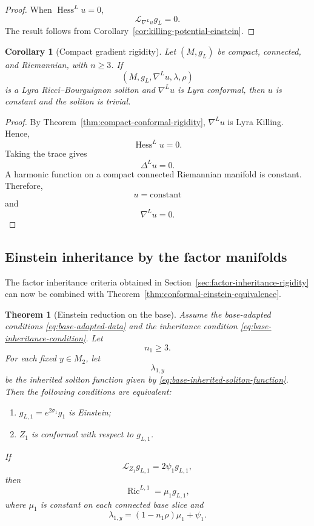 \documentclass[a4paper,11pt]{article}
\theoremstyle{plain}
\newtheorem{theorem}{Theorem}[section]
\newtheorem{corollary} {Corollary}[section]
\numberwithin{equation}{section}
\begin{document}
\begin{proof}
	When \(\operatorname{Hess}^{L}u=0\),
	\[
	\mathcal L_{\nabla^{L}u}g_{L}=0.
	\]
	The result follows from
	Corollary~\ref{cor:killing-potential-einstein}.
\end{proof}

\begin{corollary}[Compact gradient rigidity]
	\label{cor:compact-gradient-conformal-rigidity}
	Let \((M,g_{L})\) be compact, connected, and Riemannian, with
	\(n\geq3\). If
	\[
	\left(
	M,g_{L},\nabla^{L}u,\lambda,\rho
	\right)
	\]
	is a Lyra Ricci--Bourguignon soliton and
	\(\nabla^{L}u\) is Lyra conformal, then \(u\) is constant and
	the soliton is trivial.
\end{corollary}

\begin{proof}
	By Theorem~\ref{thm:compact-conformal-rigidity},
	\(\nabla^{L}u\) is Lyra Killing. Hence,
	\[
	\operatorname{Hess}^{L}u=0.
	\]
	Taking the trace gives
	\[
	\Delta^{L}u=0.
	\]
	A harmonic function on a compact connected Riemannian manifold
	is constant. Therefore,
	\[
	u=\mathrm{constant}
	\]
	and
	\[
	\nabla^{L}u=0.
	\]
\end{proof}

\subsection{Einstein inheritance by the factor manifolds}
\label{subsec:einstein-factor-inheritance}

The factor inheritance criteria obtained in
Section~\ref{sec:factor-inheritance-rigidity} can now be combined
with Theorem~\ref{thm:conformal-einstein-equivalence}.

\begin{theorem}[Einstein reduction on the base]
	\label{thm:base-einstein-reduction}
	Assume the base-adapted conditions
	\eqref{eq:base-adapted-data} and the inheritance condition
	\eqref{eq:base-inheritance-condition}. Let
	\[
	n_{1}\geq3.
	\]
	For each fixed \(y\in M_{2}\), let
	\[
	\lambda_{1,y}
	\]
	be the inherited soliton function given by
	\eqref{eq:base-inherited-soliton-function}. Then the following
	conditions are equivalent:
	\begin{enumerate}
		\item \(g_{L,1}=e^{2\sigma_{1}}g_{1}\) is Einstein;
		\item \(Z_{1}\) is conformal with respect to \(g_{L,1}\).
	\end{enumerate}
	
	If
	\begin{equation}
		\mathcal L_{Z_{1}}g_{L,1}
		=
		2\psi_{1}g_{L,1},
		\label{eq:base-lyra-conformal-field}
	\end{equation}
	then
	\begin{equation}
		\operatorname{Ric}^{L,1}
		=
		\mu_{1}g_{L,1},
		\label{eq:base-lyra-einstein}
	\end{equation}
	where \(\mu_{1}\) is constant on each connected base slice and
	\begin{equation}
		\lambda_{1,y}
		=
		(1-n_{1}\rho)\mu_{1}
		+
		\psi_{1}.
		\label{eq:base-einstein-relation}
	\end{equation}
\end{theorem}
\end{document}
